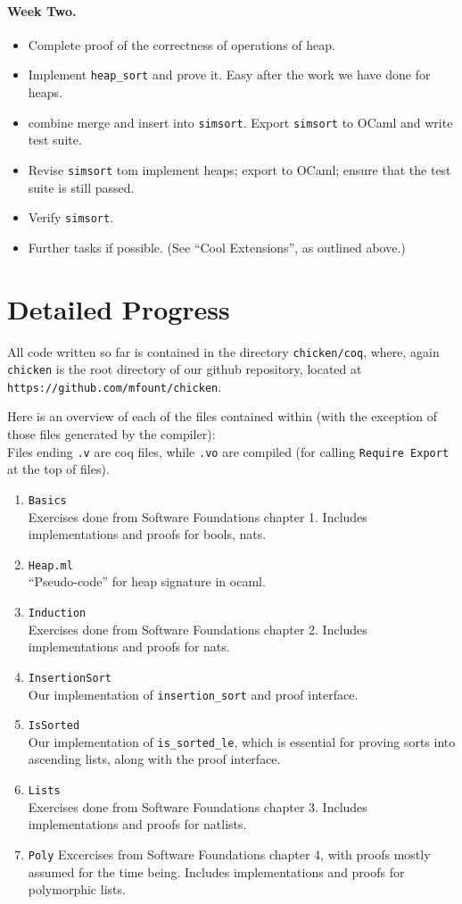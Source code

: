 \documentclass{article}
\begin{document}
\paragraph{Week Two.}
\begin{itemize}
\item Complete proof of the correctness of operations of heap.
\item Implement \verb+heap_sort+ and prove it. Easy after the work we have done for heaps.
\item combine merge and insert into \verb`simsort`.
  Export \verb+simsort+ to OCaml and write test suite.
\item Revise \verb`simsort` tom implement heaps; export to OCaml;
  ensure that the test suite is still passed.
\item Verify \verb`simsort`.
\item Further tasks if possible. (See ``Cool Extensions'', as outlined above.)
\end{itemize}


\section{Detailed Progress}
All code written so far is contained in the directory
\verb`chicken/coq`, where, again
\verb|chicken| is the root directory of our github
repository, located at \verb|https://github.com/mfount/chicken|.

Here is an overview of each of the files contained within
(with the exception of those files generated by the compiler):\\
Files ending \verb`.v` are coq files, while \verb`.vo` are compiled
(for calling \verb`Require Export` at the top of files).
\begin{enumerate}
\item \verb`Basics`\\
Exercises done from Software Foundations chapter 1. Includes
implementations and proofs for bools, nats.
\item \verb`Heap.ml`\\
``Pseudo-code'' for heap signature in ocaml.
\item \verb`Induction`\\
Exercises done from Software Foundations chapter 2. Includes
implementations and proofs for nats.
\item \verb`InsertionSort`\\
Our implementation of \verb`insertion_sort` and proof interface.
\item \verb`IsSorted`\\
Our implementation of \verb`is_sorted_le`, which is essential for
proving sorts into ascending lists, along with the proof interface.
\item \verb`Lists`\\
Exercises done from Software Foundations chapter 3. Includes
implementations and proofs for natlists.
\item \verb`Poly`
Excercises from Software Foundations chapter 4, with proofs mostly
assumed for the time being. Includes implementations and proofs for
polymorphic lists.
\end{enumerate}
\end{document}
